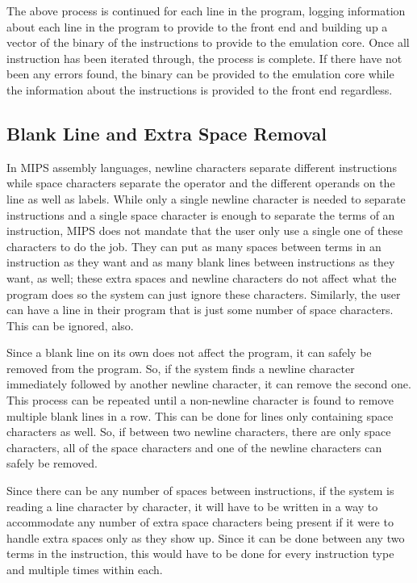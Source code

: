 \documentclass[parskip=half, fontsize=12pt]{scrartcl}
\begin{document}
The above process is continued for each line in the program, logging
information about each line in the program to provide to the front end
and building up a vector of the binary of the instructions to provide to
the emulation core. Once all instruction has been iterated through, the
process is complete. If there have not been any errors found, the binary
can be provided to the emulation core while the information about the
instructions is provided to the front end regardless.

\subsection{Blank Line and Extra Space Removal}

In MIPS assembly languages, newline characters separate different
instructions while space characters separate the operator and the
different operands on the line as well as labels. While only a single
newline character is needed to separate instructions and a single space
character is enough to separate the terms of an instruction, MIPS does
not mandate that the user only use a single one of these characters to
do the job. They can put as many spaces between terms in an instruction
as they want and as many blank lines between instructions as they want,
as well; these extra spaces and newline characters do not affect what
the program does so the system can just ignore these characters.
Similarly, the user can have a line in their program that is just some
number of space characters. This can be ignored, also.

Since a blank line on its own does not affect the program, it can safely
be removed from the program. So, if the system finds a newline character
immediately followed by another newline character, it can remove the
second one. This process can be repeated until a non-newline character
is found to remove multiple blank lines in a row. This can be done for
lines only containing space characters as well. So, if between two
newline characters, there are only space characters, all of the space
characters and one of the newline characters can safely be removed.

Since there can be any number of spaces between instructions, if the
system is reading a line character by character, it will have to be
written in a way to accommodate any number of extra space characters
being present if it were to handle extra spaces only as they show up.
Since it can be done between any two terms in the instruction, this
would have to be done for every instruction type and multiple times
within each.
\end{document}
